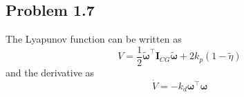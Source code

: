\subsection*{Problem 1.7}
The Lyapunov function can be written as 
 \begin{equation}
	 V = \frac{1}{2} \tilde{\boldsymbol{\omega}}^{\top} \mathbf{I}_{CG}\tilde{\boldsymbol{\omega}} + 2 k_p (1-\tilde{\eta})
 \end{equation}
and the derivative as 
\begin{equation}
	\dot{V} = -k_d \boldsymbol{\omega}^{\top} \boldsymbol{\omega}
\end{equation}

